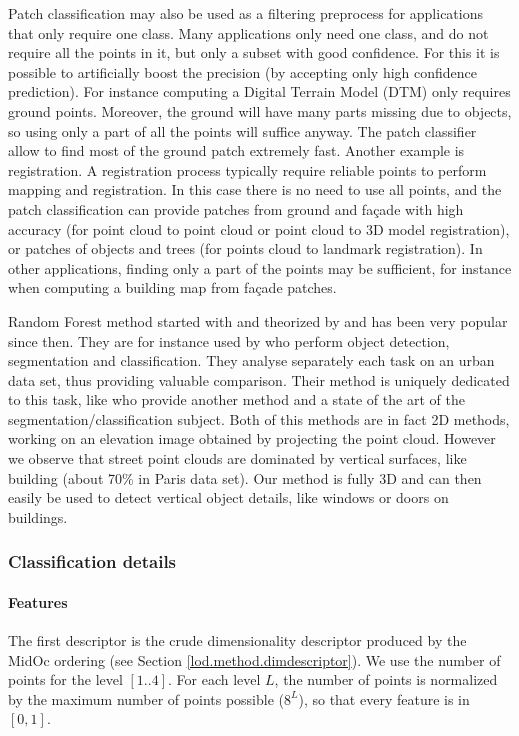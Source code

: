 		Patch classification may also be used as a filtering preprocess for applications that only require one class. 
		Many applications only need one class, and do not require all the points in it, but only a subset with good confidence.
		For this it is possible to artificially boost the precision (by accepting only high confidence prediction).
		For instance computing a Digital Terrain Model (DTM) only requires ground points.
		Moreover, the ground will have many parts missing due to objects,
		so using only a part of all the points will suffice anyway. 
		The patch classifier allow to find most of the ground patch extremely fast.
		Another example is registration.
		A registration process typically require reliable points to perform mapping and registration.
		In this case there is no need to use all points,
		and the patch classification can provide patches from ground and façade with high accuracy
		(for point cloud to point cloud or point cloud to 3D model registration),
		or patches of objects and trees (for points cloud to landmark registration).
		In other applications, finding only a part of the points may be sufficient, for instance when computing a building map from façade patches.
		
		
		
		Random Forest method started with \cite{Amit97shapequantization} and theorized by \cite{Breiman2001} and has been very popular since then. They are for instance used by \cite{Golovinskiy2009} who perform object detection, segmentation and classification. They analyse separately each task on an urban data set, thus providing valuable comparison. Their method is uniquely dedicated to this task, like \cite{Serna2014} who provide another method and a state of the art of the segmentation/classification subject.
		Both of this methods are in fact 2D methods, working on an elevation image obtained by projecting the point cloud. However we observe that street point clouds are dominated by vertical surfaces, like building (about 70\% in Paris data set). Our method is fully 3D and can then easily be used to detect vertical object details, like windows or doors on buildings.
		
		
		\subsubsection{Classification details}  
		\paragraph{Features}
		The first descriptor is the crude dimensionality descriptor produced by the MidOc ordering (see Section \ref{lod.method.dimdescriptor}).
		We use the number of points for the level $[1..4]$. For each level $L$, the number of points is normalized by the maximum number of points possible ($8^L$), so that every feature is in $[0,1]$.
		
